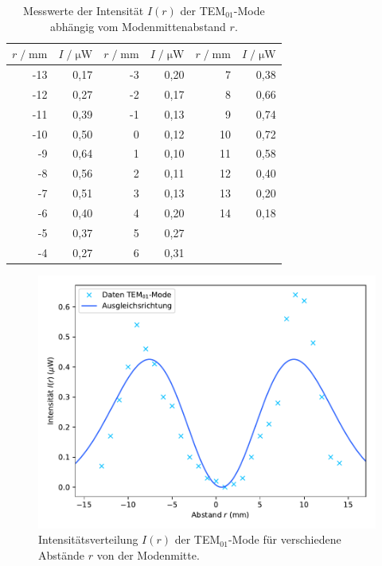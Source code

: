 \begin{table}[H]
    \centering
    \footnotesize
    \caption{Messwerte der Intensität $I(r)$ der TEM$_{01}$-Mode abhängig vom Modenmittenabstand $r$.}
    \label{tab:TEM01}
    \begin{tabular}{r r | r r | r r}
    \toprule
    $r \;/\; \si{\milli\meter}$ & $I \;/\; \si{\micro\watt}$ & $r \;/\; \si{\milli\meter}$ & $I \;/\; \si{\micro\watt}$
    & $r \;/\; \si{\milli\meter}$ & $I \;/\; \si{\micro\watt}$ \\
    \midrule
        -13 & 0,17 & -3 & 0,20 &  7 & 0,38 \\
        -12 & 0,27 & -2 & 0,17 &  8 & 0,66 \\
        -11 & 0,39 & -1 & 0,13 &  9 & 0,74 \\
        -10 & 0,50 &  0 & 0,12 & 10 & 0,72 \\
         -9 & 0,64 &  1 & 0,10 & 11 & 0,58 \\
         -8 & 0,56 &  2 & 0,11 & 12 & 0,40 \\
         -7 & 0,51 &  3 & 0,13 & 13 & 0,20 \\
         -6 & 0,40 &  4 & 0,20 & 14 & 0,18 \\
         -5 & 0,37 &  5 & 0,27 \\
         -4 & 0,27 &  6 & 0,31 \\
    \bottomrule
    \end{tabular}
\end{table}

\vspace{-15pt}

\begin{figure}[H]
    \centering
    \includegraphics[scale=0.65]{content/TEM01.pdf}
    \vspace{-10pt}
    \caption{Intensitätsverteilung $I(r)$ der TEM$_{01}$-Mode für verschiedene Abstände $r$ von der Modenmitte.}
    \label{fig:TEM01}
\end{figure}

